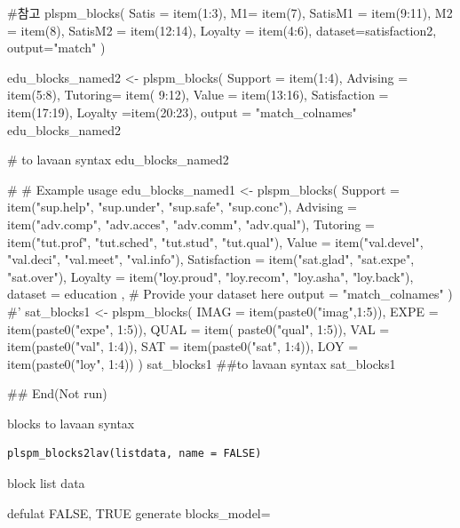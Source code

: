 \documentclass[a4paper]{book}
\begin{document}
\begin{Examples}
\begin{ExampleCode}
#참고
plspm_blocks(
  Satis = item(1:3),
  M1= item(7),
  SatisM1 = item(9:11),
  M2 = item(8),
  SatisM2 = item(12:14),
  Loyalty = item(4:6),
  dataset=satisfaction2,
  output="match"
)



edu_blocks_named2 <- plspm_blocks(
  Support = item(1:4),
  Advising = item(5:8),
  Tutoring= item( 9:12),
  Value = item(13:16),
  Satisfaction = item(17:19),
  Loyalty =item(20:23),
  output = "match_colnames"
edu_blocks_named2

# to lavaan syntax
edu_blocks_named2 %

# # Example usage
edu_blocks_named1 <- plspm_blocks(
  Support = item("sup.help", "sup.under", "sup.safe", "sup.conc"),
  Advising = item("adv.comp", "adv.acces", "adv.comm", "adv.qual"),
  Tutoring = item("tut.prof", "tut.sched", "tut.stud", "tut.qual"),
  Value = item("val.devel", "val.deci", "val.meet", "val.info"),
  Satisfaction = item("sat.glad", "sat.expe", "sat.over"),
  Loyalty = item("loy.proud", "loy.recom", "loy.asha", "loy.back"),
  dataset = education , # Provide your dataset here
  output = "match_colnames"
)
#'
sat_blocks1 <- plspm_blocks(
  IMAG = item(paste0("imag",1:5)),
  EXPE = item(paste0("expe", 1:5)),
  QUAL = item( paste0("qual", 1:5)),
  VAL = item(paste0("val", 1:4)),
  SAT = item(paste0("sat", 1:4)),
  LOY = item(paste0("loy", 1:4))
)
sat_blocks1
##to lavaan syntax
sat_blocks1 %




## End(Not run)

\end{ExampleCode}
\end{Examples}
%
\begin{Description}
blocks to lavaan syntax
\end{Description}
%
\begin{Usage}
\begin{verbatim}
plspm_blocks2lav(listdata, name = FALSE)
\end{verbatim}
\end{Usage}
%
\begin{Arguments}
\begin{ldescription}
\item[\code{listdata}] block list data

\item[\code{name}] defulat FALSE, TRUE generate blocks\_model=
\end{ldescription}
\end{Arguments}
\end{document}

